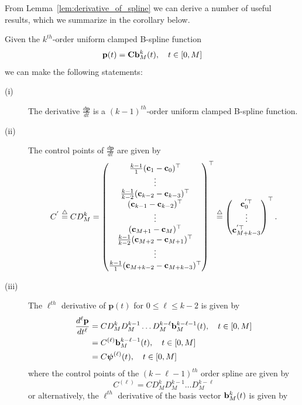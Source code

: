 From Lemma~\ref{lem:derivative_of_spline} we can derive a number of useful results, which we summarize in the corollary below.
\begin{corollary} \label{cor:derivatives_clamped_splines}
	Given the $k^{th}$-order uniform clamped B-spline function
	\[
	\mathbf{p}(t) = \mathbf{C} \mathbf{b}_M^k(t), \quad t\in[0, M]
	\]
	we can make the following statements:
	\begin{description}
	\item[(i)] The derivative  $\frac{d\mathbf{p}}{dt}$ is a $(k-1)^{th}$-order uniform clamped B-spline function.
	\item[(ii)] The control points of $\frac{d\mathbf{p}}{dt}$ are given by
		\[
		C^{'} \stackrel{\triangle}{=} C D_M^k = \begin{pmatrix}
				\frac{k-1}{1} (\mathbf{c}_1 - \mathbf{c}_0)^\top \\
				\vdots \\
				\frac{k-1}{k-2} (\mathbf{c}_{k-2} - \mathbf{c}_{k-3})^\top \\
				(\mathbf{c}_{k-1} - \mathbf{c}_{k-2})^\top \\
				\vdots \\
				(\mathbf{c}_{M+1} - \mathbf{c}_{M})^\top \\
				\frac{k-1}{k-2} (\mathbf{c}_{M+2}-\mathbf{c}_{M+1})^\top \\
				\vdots \\
				\frac{k-1}{1} (\mathbf{c}_{M+k-2} - \mathbf{c}_{M+k-3})^\top
 				\end{pmatrix}^\top
 			\stackrel{\triangle}{=} \begin{pmatrix}
 			        \mathbf{c}_0^{'\top} \\
 			        \vdots \\
 			        \mathbf{c}_{M+k-3}^{'\top}
 				   \end{pmatrix}^\top.
		\]
	\item[(iii)] The $\ell^{th}$ derivative of $\mathbf{p}(t)$ for $0\leq\ell\leq k-2$ is given by
		\begin{align*}
			\frac{d^{\ell}\mathbf{p}}{dt^{\ell}} 
			&= C D_M^k D_M^{k-1} \dots D_M^{k-\ell} \mathbf{b}_M^{k-\ell-1}(t), \quad t\in [0, M] \\
			&= C^{(\ell)} \mathbf{b}_M^{k-\ell-1}(t), \quad t\in [0, M] \\
			&= C \boldsymbol{\psi}^{(\ell)}(t), \quad t\in [0, M] \\
		\end{align*}
		where the control points of the $(k-\ell-1)^{th}$ order spline are given by
		\[
			C^{(\ell)} = C D_M^k D_M^{k-1} \dots D_M^{k-\ell}
		\]
		or alternatively, the $\ell^{th}$ derivative of the basis vector $\mathbf{b}_M^k(t)$ is given by

\end{description}
\end{corollary}
